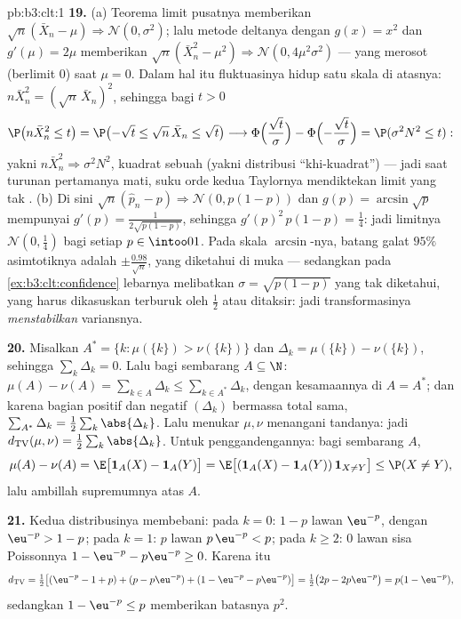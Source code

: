 \begin{solution}{pb:b3:clt:1}
\textbf{19.} (a) Teorema limit pusatnya memberikan $\sqrt n(\bar X_n - \mu)
\Rightarrow \mathcal N(0, \sigma^2)$; lalu metode deltanya
dengan $g(x) = x^2$ dan $g'(\mu) = 2\mu$ memberikan $\sqrt n(\bar
X_n^2 - \mu^2) \Rightarrow \mathcal N(0, 4\mu^2\sigma^2)$
--- yang merosot (berlimit $0$) saat $\mu = 0$. Dalam hal itu
fluktuasinya hidup satu skala di atasnya: $n\bar X_n^2 =
(\sqrt n\,\bar X_n)^2$, sehingga bagi $t > 0$
\[
\P\bigl(n\bar X_n^2 \leq t\bigr) = \P\bigl(-\sqrt t \leq
\sqrt n\,\bar X_n \leq \sqrt t\bigr) \longrightarrow
\Phi\Bigl(\frac{\sqrt t}\sigma\Bigr) -
\Phi\Bigl(-\frac{\sqrt t}\sigma\Bigr) = \P(\sigma^2N^2
\leq t) :
\]
yakni $n\bar X_n^2 \Rightarrow \sigma^2N^2$, kuadrat sebuah
 (yakni distribusi ``khi-kuadrat'') --- jadi saat turunan
pertamanya mati, suku orde kedua Taylornya mendiktekan
limit yang tak . (b) Di sini $\sqrt n(\hat p_n - p)
\Rightarrow \mathcal N(0, p(1 - p))$ dan $g(p) =
\arcsin\sqrt p$ mempunyai $g'(p) = \frac1{2\sqrt{p(1 - p)}}$, sehingga
$g'(p)^2\,p(1 - p) = \frac14$: jadi limitnya $\mathcal
N(0, \frac14)$ bagi setiap $p \in \intoo01$. Pada skala
$\arcsin$-nya, batang galat $95\%$ asimtotiknya adalah $\pm
\frac{0.98}{\sqrt n}$, yang diketahui di muka --- sedangkan pada
\cref{ex:b3:clt:confidence} lebarnya melibatkan
$\sigma = \sqrt{p(1-p)}$ yang tak diketahui, yang harus dikasuskan terburuk oleh $\frac12$
atau ditaksir: jadi transformasinya \emph{menstabilkan}
variansnya.

\textbf{20.} Misalkan $A^* = \{k : \mu(\{k\}) > \nu(\{k\})\}$
dan $\Delta_k = \mu(\{k\}) - \nu(\{k\})$, sehingga
$\sum_k\Delta_k = 0$. Lalu bagi sembarang $A \subseteq \N$: $\mu(A) -
\nu(A) = \sum_{k\in A}\Delta_k \leq \sum_{k\in
A^*}\Delta_k$, dengan kesamaannya di $A = A^*$; dan karena
bagian positif dan negatif $(\Delta_k)$ bermassa
total sama, $\sum_{A^*}\Delta_k =
\frac12\sum_k\abs{\Delta_k}$. Lalu menukar $\mu, \nu$ menangani
tandanya: jadi $d_{\mathrm{TV}}(\mu, \nu) =
\frac12\sum_k\abs{\Delta_k}$. Untuk penggandengannya: bagi sembarang $A$,
\[
\mu(A) - \nu(A) = \E\bigl[\mathbf 1_A(X) - \mathbf
1_A(Y)\bigr] = \E\bigl[(\mathbf 1_A(X) - \mathbf
1_A(Y))\,\mathbf 1_{X\neq Y}\bigr] \leq \P(X \neq Y),
\]
lalu ambillah supremumnya atas $A$.

\textbf{21.} Kedua distribusinya membebani: pada $k = 0$: $1 - p$ lawan
$\eu^{-p}$, dengan $\eu^{-p} > 1 - p$; pada $k = 1$: $p$ lawan
$p\,\eu^{-p} < p$; pada $k \geq 2$: $0$ lawan sisa
Poissonnya $1 - \eu^{-p} - p\eu^{-p} \geq 0$. Karena itu
\[
d_{\mathrm{TV}} = \tfrac12\bigl[(\eu^{-p} - 1 + p) + (p -
p\eu^{-p}) + (1 - \eu^{-p} - p\eu^{-p})\bigr] =
\tfrac12\bigl(2p - 2p\eu^{-p}\bigr) = p(1 - \eu^{-p}),
\]
sedangkan $1 - \eu^{-p} \leq p$ memberikan batasnya $p^2$.


\end{solution}
